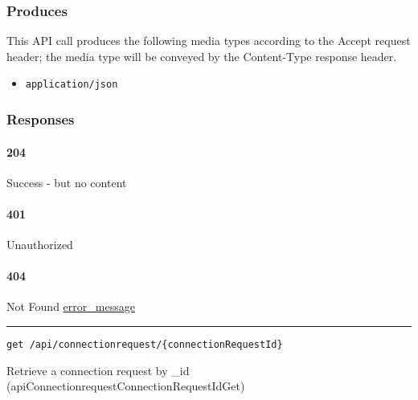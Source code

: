 \hypertarget{produces-23}{%
\subsubsection{Produces}\label{produces-23}}

This API call produces the following media types according to the
{Accept} request header; the media type will be conveyed by the
{Content-Type} response header.

\begin{itemize}
\tightlist
\item
  \texttt{application/json}
\end{itemize}

\hypertarget{responses-23}{%
\subsubsection{Responses}\label{responses-23}}

\hypertarget{section-76}{%
\paragraph{204}\label{section-76}}

Success - but no content \protect\hyperlink{}{}

\hypertarget{section-77}{%
\paragraph{401}\label{section-77}}

Unauthorized \protect\hyperlink{}{}

\hypertarget{section-78}{%
\paragraph{404}\label{section-78}}

Not Found \protect\hyperlink{error_message}{error\_message}

\begin{center}\rule{0.5\linewidth}{\linethickness}\end{center}

\protect\hypertarget{apiConnectionrequestConnectionRequestIdGet}{}{}

\begin{verbatim}
get /api/connectionrequest/{connectionRequestId}
\end{verbatim}

Retrieve a connection request by \_id
({apiConnectionrequestConnectionRequestIdGet})

